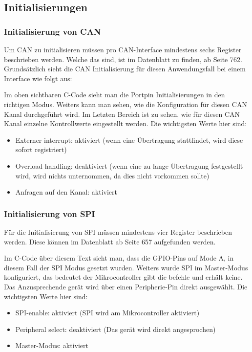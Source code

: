 \documentclass[paper=a4, 12pt]{scrreprt}
\begin{document}
		\subsection{Initialisierungen}\hfill \break
		\subsubsection{Initialisierung von CAN}\hfill \break
		Um CAN zu initialisieren müssen pro CAN-Interface mindestens sechs Register beschrieben werden.
		Welche das sind, ist im Datenblatt zu finden, ab Seite 762. 
		Grundsätzlich sieht die CAN Initialisierung für diesen Anwendungsfall bei einem Interface wie folgt aus:
		
		Im oben sichtbaren C-Code sieht man die Portpin Initialisierungen in den richtigen Modus. Weiters kann man sehen, wie die Konfiguration für diesen CAN Kanal durchgeführt wird. Im Letzten Bereich ist zu sehen, wie für diesen CAN Kanal einzelne Kontrollwerte eingestellt werden.
		Die wichtigsten Werte hier sind:
		\begin{itemize}
			\item Externer interrupt: aktiviert (wenn eine Übertragung stattfindet, wird diese sofort registriert)
			\item Overload handling: deaktiviert (wenn eine zu lange Übertragung festgestellt wird, wird nichts unternommen, da dies nicht vorkommen sollte)
			\item Anfragen auf den Kanal: aktiviert
		\end{itemize} 
		\newpage
		\subsubsection{Initialisierung von SPI}\hfill \break
		Für die Initialisierung von SPI müssen mindestens vier Register beschrieben werden. Diese können im Datenblatt ab Seite 657 aufgefunden werden.
		
		Im C-Code über diesem Text sieht man, dass die GPIO-Pins auf Mode A, in diesem Fall der SPI Modus gesetzt wurden. Weiters wurde SPI im Master-Modus konfiguriert, das bedeutet der Mikrocontroller gibt die befehle und erhält keine. Das Anzusprechende gerät wird über einen Peripherie-Pin direkt ausgewählt.
		Die wichtigsten Werte hier sind:
		\begin{itemize}
			\item SPI-enable: aktiviert (SPI wird am Mikrocontroller aktiviert)
			\item Peripheral select: deaktiviert (Das gerät wird direkt angesprochen)
			\item Master-Modus: aktiviert
		\end{itemize} \newpage
\end{document}
